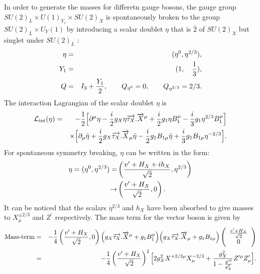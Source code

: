 \documentclass{ws-ijmpa}
\begin{document}
In order to generate the masses for differetn gauge bosons, the gauge group $SU(2)_L\times U(1)_{Y_1}\times SU(2)_X$ is
spontaneously broken to the group $SU(2)_L\times U_Y(1)$ by
introducing a scalar doublet $\eta$ that is $\bar{2}$ of $SU(2)_X$ but singlet under  $SU(2)_L$ :
\begin{eqnarray}
\eta &=&( \eta^{0}, \eta^{2/3})\notag  ,\\
 Y_1&=& ( 1, \quad {1\over 3})\notag ,\\
 Q & = & I_{3}+\frac{Y_1}{2},\quad\quad Q_{\eta^{0}} = 0, \quad\quad Q_{\eta^{2/3}} = 2/3\label{10}.
\end{eqnarray}
The interaction Lagrangian of the scalar doublet $\eta$ is
\begin{eqnarray}
\mathcal{L}_{\text{int}}(\eta) &=& -\frac{1}{2}\Big[\partial^{\mu}\eta-{i\over
2}g_X\eta\overrightarrow{\tau_X}.\overrightarrow{X}^{\mu}+{i\over
2}g_1\eta
B^{\mu}_1-{i\over3}g_1\eta^{2/3}B^{\mu}_1\Big]\notag\\
 &&\times \Big[\partial_{\mu}\bar\eta+{i\over
2}g_X\overrightarrow{\tau_X}.\overrightarrow{X}_{\mu}\bar\eta-{i\over
2}g_1
B_{1\mu}\bar\eta+{i\over3}g_1B_{1\mu}\eta^{-2/3}\Big]\label{11}.
\end{eqnarray}
For spontaneous symmetry breaking, $\eta$ can be written in the form:
\begin{align}
\eta=(\eta^{0},
\eta^{2/3})=&\left(\frac{v^{\prime}+H_X+ih_X}{\sqrt2}, \eta^{2/3}\right)\notag\\
\rightarrow&\left(\frac{v^{\prime}+H_X}{\sqrt2}, 0\right)\notag .
\end{align}
It can be noticed that the scalars $\eta^{2/3}$ and $h_X$ have been
absorbed to give masses to $X_{\mu}^{\pm 2/3}$ and $Z^{\prime}$
respectively. The mass term for the vector boson is given by
\begin{eqnarray}
\text{Mass-term}& = &-{1\over4}\left(\frac{v^{\prime}+H_X}{\sqrt2}, 0\right)\Big(g_X\overrightarrow{\tau_X}.\overrightarrow{X}^{\mu}
+g_1B_1^{\mu}\Big)\Big(g_X\overrightarrow{\tau_X}.\overrightarrow{X}_{\mu}
+g_1B_{1\mu}\Big)\left(\begin{array}{cc}
\frac{v^{\prime}+H_X}{\sqrt2}\\ 0\end{array}\right)\notag\\
& = &-{1\over4}\left(\frac{v^{\prime}+H_X}{\sqrt2}\right)^2\Big[2g_X^{2}X^{+ 2/3
\mu}X_{\mu}^{-2/3}+\frac{g_X^{2}}{1- {g^{\prime 2}\over g_X^{2}}}Z^{\prime\mu}Z^{\prime}_{\mu}\Big]\notag .
\end{eqnarray}
\end{document}
